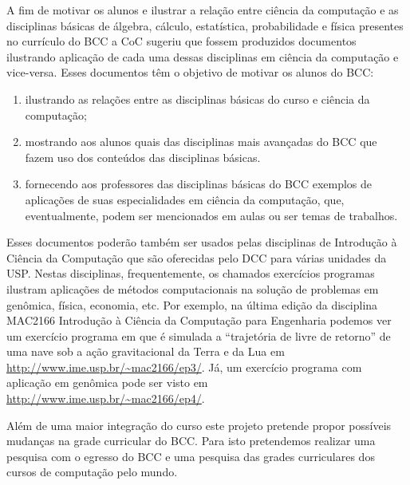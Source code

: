 

A fim de motivar os alunos e ilustrar a relação entre ciência da computação e
as disciplinas básicas de álgebra, cálculo, estatística, probabilidade e
física presentes no currículo do BCC a CoC sugeriu que fossem produzidos
documentos ilustrando aplicação de cada uma dessas disciplinas em ciência
da computação e vice-versa.  Esses documentos têm o
objetivo de motivar os alunos do BCC:
\begin{enumerate}%
\item ilustrando as relações entre as disciplinas
      básicas do curso e ciência da computação;
\item mostrando aos alunos quais das disciplinas mais avançadas do BCC
      que fazem uso dos conteúdos das disciplinas básicas.
\item \label{proc-esto} fornecendo aos professores das disciplinas básicas
      do BCC exemplos de aplicações de suas especialidades em ciência
      da computação, que, eventualmente, podem ser mencionados em aulas
      ou ser temas de trabalhos.
\end{enumerate}

Esses documentos poderão também ser usados pelas disciplinas de
Introdução à Ciência da Computação que são oferecidas pelo DCC para
várias unidades da USP. Nestas disciplinas, frequentemente, os chamados
exercícios programas ilustram aplicações de métodos computacionais na
solução de problemas em genômica, física, economia, etc.
Por exemplo, na última edição da disciplina
MAC2166 Introdução à Ciência da Computação para Engenharia
podemos ver um exercício programa em que é simulada
a ``trajetória de livre de retorno'' de uma nave sob a ação gravitacional da
Terra e da Lua em \url{http://www.ime.usp.br/~mac2166/ep3/}. Já, um exercício programa com aplicação em genômica pode ser visto em \url{http://www.ime.usp.br/~mac2166/ep4/}.


Além de uma maior integração do curso este projeto pretende propor possíveis
mudanças na grade curricular do BCC. %
Para isto pretendemos realizar uma pesquisa com o egresso do
BCC e uma pesquisa das grades curriculares dos cursos de computação
pelo mundo.
